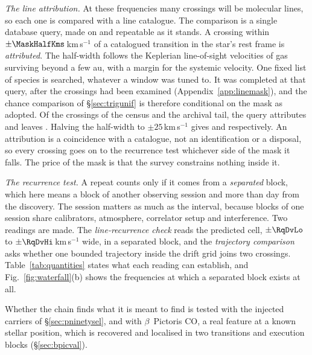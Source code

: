 \emph{The line attribution.} At these frequencies many crossings will be
molecular lines, so each one is compared with a line catalogue. The
comparison is a single database query, made on \MkListDate{} and repeatable
as it stands. A crossing within $\pm\MaskHalfKms$\,km\,s$^{-1}$ of a
catalogued transition in the star's rest frame is \emph{attributed}. The
half-width follows the Keplerian line-of-sight velocities of gas surviving
beyond a few au, with a margin for the systemic velocity. One fixed list of
\FrNSpec{} species is searched, whatever a window was tuned to. It was
completed at that query, after the crossings had been examined
(Appendix~\ref{app:linemask}), and the chance comparison of
\S\ref{sec:trigunif} is therefore conditional on the mask as adopted. Of the
\CnCross{} crossings of the census and the archival tail, the query attributes
\FrAttrWFifty{} and leaves \FrUnattrWFifty. Halving the half-width to
$\pm25$\,km\,s$^{-1}$ gives \FrAttrWTwentyFive{} and \FrUnattrWTwentyFive{}
respectively.
An attribution is a coincidence with a catalogue, not an identification or a
disposal, so every crossing goes on to the recurrence test whichever side of
the mask it falls. The price of the mask is that the survey constrains
nothing inside it.

\emph{The recurrence test.} A repeat counts only if it comes from a
\emph{separated} block, which here means a block of another observing session
and more than \EpSep{} day from the discovery. The session matters as much as
the interval, because blocks of one session share calibrators, atmosphere,
correlator setup and interference. Two readings are made. The
\emph{line-recurrence check} reads the predicted cell, $\pm\RqDvLo$ to
$\pm\RqDvHi$\,km\,s$^{-1}$ wide, in a separated block, and the
\emph{trajectory comparison} asks whether one bounded trajectory inside the
drift grid joins two crossings. Table~\ref{tab:quantities} states what each
reading can establish, and Fig.~\ref{fig:waterfall}(b) shows the frequencies
at which a separated block exists at all.

Whether the chain finds what it is meant to find is tested with the injected
carriers of \S\ref{sec:pninetysel}, and with $\beta$~Pictoris CO, a real
feature at a known stellar position, which is recovered and localised in two
transitions and \CsBpCoBlocks{} execution blocks (\S\ref{sec:bpicval}).



